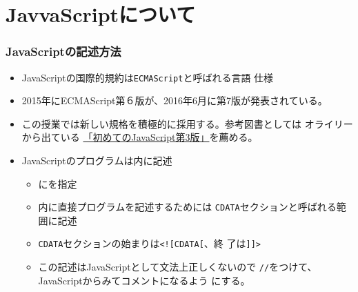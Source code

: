 

\frame{\maketitle}
\section{JavvaScriptについて}
\begin{frame}[containsverbatim]
 \frametitle{JavaScriptの記述方法}
 \begin{itemize}
  \item JavaScriptの国際的規約は\texttt{ECMAScript}と呼ばれる言語
        仕様
	\item 2015年にECMAScript第６版が、2016年6月に第7版が発表されている。
	\item この授業では新しい規格を積極的に採用する。参考図書としては
				オライリーから出ている
				\href{https://www.amazon.co.jp/%E5%88%9D%E3%82%81%E3%81%A6%E3%81%AEJavaScript-%E7%AC%AC3%E7%89%88-ES2015%E4%BB%A5%E9%99%8D%E3%81%AE%E6%9C%80%E6%96%B0%E3%82%A6%E3%82%A7%E3%83%96%E9%96%8B%E7%99%BA-Ethan-Brown/dp/4873117836/ref=sr_1_1?s=books&ie=UTF8&qid=1493275993&sr=1-1&keywords=%E5%88%9D%E3%82%81%E3%81%A6%E3%81%AEjavascript}{
				「初めてのJavaScript第3版」}を薦める。
  \item JavaScriptのプログラムは内に記述
        \begin{itemize}
         \item {}にを指定
         \item {}内に直接プログラムを記述するためには
               \texttt{CDATA}セクションと呼ばれる範囲に記述
         \item \texttt{CDATA}セクションの始まりは\Verb+<![CDATA[+、終
               了は\Verb+]]>+
         \item この記述はJavaScriptとして文法上正しくないので
               \texttt{//}をつけて、JavaScriptからみてコメントになるよう
               にする。
        \end{itemize}
 \end{itemize}
\end{frame}
